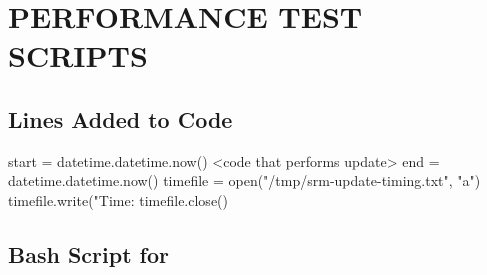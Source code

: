 \chapter{PERFORMANCE TEST SCRIPTS}
\label{app:test_scripts}

\section{Lines Added to \snowman{} Code}

\begin{python}[caption=Code lines used for
timing.,label=lst:timing_code_snowman] 
start = datetime.datetime.now()
<code that performs update>
end = datetime.datetime.now()
timefile = open("/tmp/srm-update-timing.txt", "a")
timefile.write("Time: %
timefile.close()
\end{python}

\section{Bash Script for \snowman{}}

